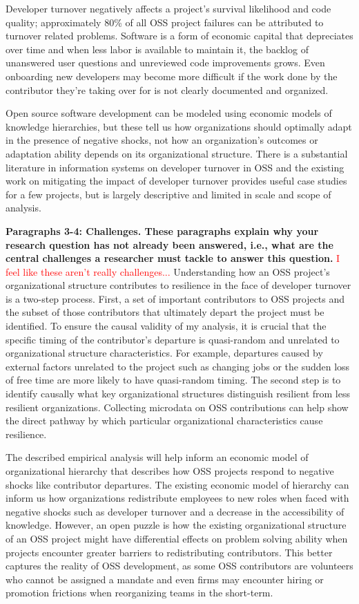 \documentclass[source/paper/main.tex]{subfiles}
\begin{document}
Developer turnover negatively affects a project's survival likelihood and code quality; approximately 80\% of all OSS project failures can be attributed to turnover related problems. Software is a form of economic capital that depreciates over time and when less labor is available to maintain it, the backlog of unanswered user questions and unreviewed code improvements grows. Even onboarding new developers may become more difficult if the work done by the contributor they're taking over for is not clearly documented and organized. 

Open source software development can be modeled using economic models of knowledge hierarchies, but these tell us how organizations should optimally adapt in the presence of negative shocks, not how an organization's outcomes or adaptation ability depends on its organizational structure. There is a substantial literature in information systems on developer turnover in OSS and  the existing work on mitigating the impact of developer turnover provides useful case studies for a few projects, but is largely descriptive and limited in scale and scope of analysis. 


\textbf{Paragraphs 3-4: Challenges. These paragraphs explain why your research question has not already been answered, i.e., what are the central challenges a researcher must tackle to answer this question.}
\textcolor{red}{I feel like these aren't really challenges...}
Understanding how an OSS project's organizational structure contributes to resilience in the face of developer turnover is a two-step process. First, a set of important contributors to OSS projects and the subset of those contributors that ultimately depart the project must be identified. To ensure the causal validity of my analysis, it is crucial that the specific timing of the contributor's departure is quasi-random and unrelated to organizational structure characteristics. For example, departures caused by external factors unrelated to the project such as changing jobs or the sudden loss of free time are more likely to have quasi-random timing. The second step is to identify causally what key organizational structures distinguish resilient from less resilient organizations. Collecting microdata on OSS contributions can help show the direct pathway by which particular organizational characteristics cause resilience. 

\qquad The described empirical analysis will help inform an economic model of organizational hierarchy that describes how OSS projects respond to negative shocks like contributor departures. The existing economic model of hierarchy can inform us how organizations redistribute employees to new roles when faced with negative shocks such as developer turnover and a decrease in the accessibility of knowledge. However, an open puzzle is how the existing organizational structure of an OSS project might have differential effects on problem solving ability when projects encounter greater barriers to redistributing contributors. This better captures the reality of OSS development, as some OSS contributors are volunteers who cannot be assigned a mandate and even firms may encounter hiring or promotion frictions when reorganizing teams in the short-term.
\end{document}
